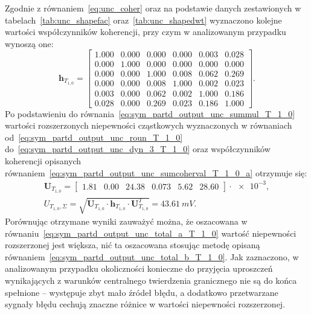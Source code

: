 Zgodnie z równaniem~\eqref{eq:unc_coher} oraz na podstawie danych zestawionych w tabelach~\ref{tab:unc_shapefac} oraz~\ref{tab:unc_shapedwt} wyznaczono kolejne wartości współczynników koherencji, przy czym w analizowanym przypadku wynoszą one:
\begin{equation}
\mathbf{h}_{T_{1,0}} =
\begin{bmatrix}
1.000 & 0.000 & 0.000 & 0.000 & 0.003 & 0.028 \\
0.000 & 1.000 & 0.000 & 0.000 & 0.000 & 0.000 \\
0.000 & 0.000 & 1.000 & 0.008 & 0.062 & 0.269 \\
0.000 & 0.000 & 0.008 & 1.000 & 0.002 & 0.023 \\
0.003 & 0.000 & 0.062 & 0.002 & 1.000 & 0.186 \\
0.028 & 0.000 & 0.269 & 0.023 & 0.186 & 1.000
\end{bmatrix}
\label{eq:sym_partd_output_unc_sumcoherval_T_1_0_a}.
\end{equation}
Po podstawieniu do równania~\eqref{eq:sym_partd_output_unc_summul_T_1_0} wartości rozszerzonych niepewności cząstkowych wyznaczonych w równaniach od~\eqref{eq:sym_partd_output_unc_roun_T_1_0} do~\eqref{eq:sym_partd_output_unc_dyn_3_T_1_0} oraz współczynników koherencji opisanych równaniem~\eqref{eq:sym_partd_output_unc_sumcoherval_T_1_0_a} otrzymuje się:
\begin{gather}
\mathbf{U}_{T_{1,0}} =
\begin{bmatrix}
\num{1.81} & \num{0.00} & \num{24.38} & \num{0.073} & \num{5.62} & \num{28.60}
\end{bmatrix} \cdot \num{e-3}
\label{eq:sym_partd_output_unc_sumuvectval_T_1_0}, \\
U_{T_{1,0},\Sigma} = \sqrt{\mathbf{U}_{T_{1,0}} \cdot \mathbf{h}_{T_{1,0}} \cdot \mathbf{U}_{T_{1,0}}^{T}} = \qty{43.61}{mV} \label{eq:sym_partd_output_unc_total_b_T_1_0}.
\end{gather}
Porównując otrzymane wyniki zauważyć można, że oszacowana w równaniu~\eqref{eq:sym_partd_output_unc_total_a_T_1_0} wartość niepewności rozszerzonej jest większa, nić ta oszacowana stosując metodę opisaną równaniem~\eqref{eq:sym_partd_output_unc_total_b_T_1_0}. Jak zaznaczono, w analizowanym przypadku okoliczności konieczne do przyjęcia uproszczeń wynikających z warunków centralnego twierdzenia granicznego nie są do końca spełnione -- występuje zbyt mało źródeł błędu, a dodatkowo przetwarzane sygnały błędu cechują znaczne różnice w wartości niepewności rozszerzonej.

